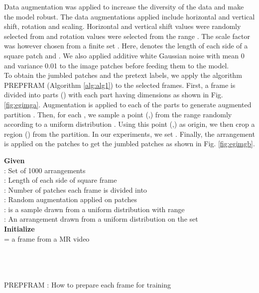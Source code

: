 \documentclass[journal]{IEEEtai}
\begin{document}
\indent
Data augmentation was applied to increase the diversity of the data and make the model robust. The data augmentations applied include horizontal and vertical shift, rotation and scaling. Horizontal and vertical shift values were randomly selected from  and rotation values were selected from the range . The scale factor was however chosen from a finite set . Here,  denotes the length of each side of a square patch and . We also applied additive white Gaussian noise with mean 0 and variance 0.01 to the image patches before feeding them to the model.\\
\indent To obtain the jumbled patches and the pretext labels, we apply the algorithm PREPFRAM (Algorithm \ref{alg:alg1}) to the selected frames. First, a frame is divided into  parts () with each part having dimensions  as shown in Fig. \ref{fig:egimga}. Augmentation  is applied to each of the  parts to generate augmented partition . Then, for each , we sample a point (,) from the range  randomly according to a uniform distribution . Using this point (,) as origin, we then crop a  region () from the partition. In our experiments, we set . Finally, the arrangement  is applied on the patches  to get the jumbled patches  as shown in Fig. \ref{fig:egimgb}.

\begin{algorithm}
\SetAlgoLined
{}
 \textbf{Given}\\
  : Set of 1000 arrangements\\
   : Length of each side of square frame\\
  : Number of patches each frame is divided into\\
  : Random augmentation applied on patches\\
  :  is a sample drawn from a uniform distribution with range \\
  : An arrangement drawn from a uniform distribution on the set \\
 \textbf{Initialize} \\
  = a frame from a MR video\\
 \\
 \\
 \\
 \caption{PREPFRAM : How to prepare each frame for training}
 \label{alg:alg1}
\end{algorithm}
\end{document}

